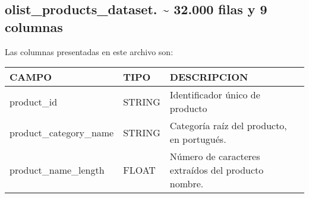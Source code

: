\documentclass[11pt]{article}
\begin{document}
    \hypertarget{olist_products_dataset.-32.000-filas-y-9-columnas}{%
\subsection{olist\_products\_dataset. \textasciitilde{} 32.000 filas y 9
columnas}\label{olist_products_dataset.-32.000-filas-y-9-columnas}}

Las columnas presentadas en este archivo son:

\begin{longtable}[]{@{}lll@{}}
\toprule
\begin{minipage}[b]{0.30\columnwidth}\raggedright
CAMPO\strut
\end{minipage} & \begin{minipage}[b]{0.30\columnwidth}\raggedright
TIPO\strut
\end{minipage} & \begin{minipage}[b]{0.30\columnwidth}\raggedright
DESCRIPCION\strut
\end{minipage}\tabularnewline
\midrule
\endhead
\begin{minipage}[t]{0.30\columnwidth}\raggedright
product\_id\strut
\end{minipage} & \begin{minipage}[t]{0.30\columnwidth}\raggedright
STRING\strut
\end{minipage} & \begin{minipage}[t]{0.30\columnwidth}\raggedright
Identificador único de producto\strut
\end{minipage}\tabularnewline
\begin{minipage}[t]{0.30\columnwidth}\raggedright
product\_category\_name\strut
\end{minipage} & \begin{minipage}[t]{0.30\columnwidth}\raggedright
STRING\strut
\end{minipage} & \begin{minipage}[t]{0.30\columnwidth}\raggedright
Categoría raíz del producto, en portugués.\strut
\end{minipage}\tabularnewline
\begin{minipage}[t]{0.30\columnwidth}\raggedright
product\_name\_length\strut
\end{minipage} & \begin{minipage}[t]{0.30\columnwidth}\raggedright
FLOAT\strut
\end{minipage} & \begin{minipage}[t]{0.30\columnwidth}\raggedright
Número de caracteres extraídos del producto nombre.\strut

\end{minipage}
\end{longtable}
\end{document}
